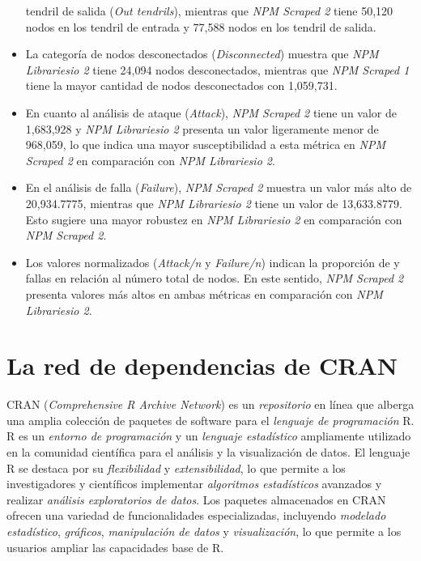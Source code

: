 \begin{itemize}
          tendril de salida (\textit{Out tendrils}), mientras que \textit{NPM Scraped 2} tiene
          50,120 nodos en los tendril de entrada y 77,588 nodos en los tendril de salida.
    \item La categoría de nodos desconectados (\textit{Disconnected}) muestra que
          \textit{NPM Librariesio 2} tiene 24,094 nodos desconectados, mientras que
          \textit{NPM Scraped 1} tiene la mayor cantidad de nodos desconectados con
          1,059,731.
    \item En cuanto al análisis de ataque (\textit{Attack}), \textit{NPM Scraped 2} tiene
          un valor de 1,683,928 y \textit{NPM Librariesio 2} presenta un valor ligeramente menor
          de 968,059, lo que indica una mayor susceptibilidad a esta métrica en \textit{NPM Scraped 2}
          en comparación con \textit{NPM Librariesio 2}.
    \item En el análisis de falla (\textit{Failure}), \textit{NPM Scraped 2} muestra un valor
          más alto de 20,934.7775, mientras que \textit{NPM Librariesio 2} tiene un valor de
          13,633.8779. Esto sugiere una mayor robustez en \textit{NPM Librariesio 2} en comparación
          con \textit{NPM Scraped 2}.
    \item Los valores normalizados (\textit{Attack/n} y \textit{Failure/n}) indican la
          proporción de y fallas en relación al número total de nodos. En este sentido,
          \textit{NPM Scraped 2} presenta valores más altos en ambas métricas en comparación
          con \textit{NPM Librariesio 2}.
\end{itemize}

\section{La red de dependencias de CRAN}

CRAN (\textit{Comprehensive R Archive Network}) es un \textit{repositorio} en línea que alberga
una amplia colección de paquetes de software para el \textit{lenguaje de programación} R.
R es un \textit{entorno de programación} y un \textit{lenguaje estadístico} ampliamente
utilizado en la comunidad científica para el análisis y la visualización de datos.
El lenguaje R se destaca por su \textit{flexibilidad} y \textit{extensibilidad},
lo que permite a los investigadores y científicos implementar \textit{algoritmos estadísticos}
avanzados y realizar \textit{análisis exploratorios de datos}.
Los paquetes almacenados en CRAN ofrecen una variedad de funcionalidades especializadas,
incluyendo \textit{modelado estadístico}, \textit{gráficos}, \textit{manipulación de datos}
y \textit{visualización}, lo que permite a los usuarios ampliar las capacidades base de R.

